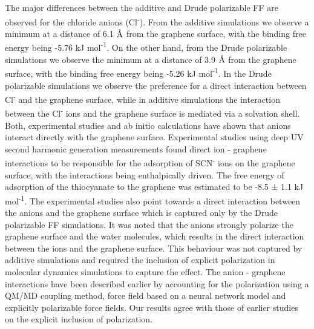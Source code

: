 The major differences between the additive and Drude polarizable FF are observed for the chloride anions (Cl\textsuperscript{-}). From the additive simulations we observe a minimum at a distance of 6.1 $\text{\normalfont\AA}$ from the graphene surface, with the binding free energy being -5.76 kJ mol\textsuperscript{-1}. On the other hand, from the Drude polarizable simulations we observe the minimum at a distance of 3.9 $\text{\normalfont\AA}$ from the graphene surface, with the binding free energy being -5.26 kJ mol\textsuperscript{-1}. In the Drude polarizable simulations we observe the preference for a direct interaction between Cl\textsuperscript{-} and the graphene surface, while in additive simulations the interaction between the Cl\textsuperscript{-} ions and the graphene surface is mediated via a solvation shell. Both, experimental studies\supercite{lee_role_2020} and ab initio calculations\supercite{shi_unexpectedly_2012,liu_super-strong_2021,xiaozhen_dft_2022,kim_theoretical_2004} have shown that anions interact directly with the graphene surface. Experimental studies using deep UV second harmonic generation measurements found direct ion - graphene interactions to be responsible for the adsorption of SCN\textsuperscript{-} ions on the graphene surface, with the interactions being enthalpically driven.\supercite{mccaffrey_mechanism_2017} The free energy of adsorption of the thiocyanate to the graphene was estimated to be -8.5 ± 1.1 kJ mol\textsuperscript{-1}. The experimental studies also point towards a direct interaction between the anions and the graphene surface which is captured only by the Drude polarizable FF simulations. It was noted that the anions strongly polarize the graphene surface and the water molecules, which results in the direct interaction between the ions and the graphene surface. This behaviour was not captured by additive simulations and required the inclusion of explicit polarization in molecular dynamics simulations to capture the effect. The anion - graphene interactions have been described earlier by accounting for the polarization using a QM/MD coupling method,\supercite{elliott_qmmd_2020} force field based on a neural network model\supercite{di_pasquale_dynamically_2021} and explicitly polarizable force fields.\supercite{misra_ion_2021} Our results agree with those of earlier studies on the explicit inclusion of polarization. 

